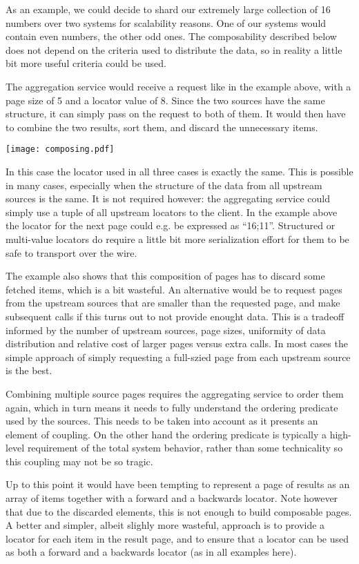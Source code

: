 \documentclass[11pt,a4paper]{article}
\begin{document}
\begin{multicols}{2}
As an example, we could decide to shard our extremely large collection of 16
numbers over two systems for scalability reasons. One of our systems would
contain even numbers, the other odd ones. The composability described
below does not depend on the criteria used to distribute the data, so in reality
a little bit more useful criteria could be used.

The aggregation service would receive a request like in the example above, with
a page size of 5 and a locator value of 8. Since the two sources have the same
structure, it can simply pass on the request to both of them. It would then have
to combine the two results, sort them, and discard the unnecessary items. 

\texttt{[image: composing.pdf]}

In this case the locator used in all three cases is exactly the same. This is
possible in many cases, especially when the structure of the data from all
upstream sources is the same. It is not required however: the aggregating
service could simply use a tuple of all upstream locators to the client. In the
example above the locator for the next page could e.g. be expressed as
``16;11''. Structured or multi-value locators do require a little bit more
serialization effort for them to be safe to transport over the wire.

The example also shows that this composition of pages has to discard some
fetched items, which is a bit wasteful. An alternative would be to request
pages from the upstream sources that are smaller than the requested page, and
make subsequent calls if this turns out to not provide enought data. This is a
tradeoff informed by the number of upstream sources, page sizes, uniformity of
data distribution and relative cost of larger pages versus extra calls. In most
cases the simple approach of simply requesting a full-szied page from each
upstream source is the best.

Combining multiple source pages requires the aggregating service to order them
again, which in turn means it needs to fully understand the ordering predicate
used by the sources. This needs to be taken into account as it presents an
element of coupling. On the other hand the ordering predicate is typically a
high-level requirement of the total system behavior, rather than some
technicality so this coupling may not be so tragic.

Up to this point it would have been tempting to represent a page of results as
an array of items together with a forward and a backwards locator. Note however
that due to the discarded elements, this is not enough to build composable
pages. A better and simpler, albeit slighly more wasteful, approach is to
provide a locator for each item in the result page, and to ensure that a locator
can be used as both a forward and a backwards locator (as in all examples
here).


\end{multicols}
\end{document}
